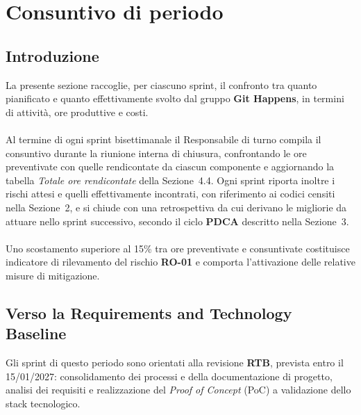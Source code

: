 \newpage

\section{Consuntivo di periodo}
\subsection{Introduzione}
La presente sezione raccoglie, per ciascuno sprint, il confronto tra quanto pianificato e quanto effettivamente svolto dal gruppo \textbf{Git Happens}, in termini di attività, ore produttive e costi. \\
\\
Al termine di ogni sprint bisettimanale il Responsabile di turno compila il consuntivo durante la riunione interna di chiusura, confrontando le ore preventivate con quelle rendicontate da ciascun componente e aggiornando la tabella \textit{Totale ore rendicontate} della Sezione~4.4. Ogni sprint riporta inoltre i rischi attesi e quelli effettivamente incontrati, con riferimento ai codici censiti nella Sezione~2, e si chiude con una retrospettiva da cui derivano le migliorie da attuare nello sprint successivo, secondo il ciclo \textbf{PDCA} descritto nella Sezione~3. \\
\\
Uno scostamento superiore al 15\% tra ore preventivate e consuntivate costituisce indicatore di rilevamento del rischio \textbf{RO-01} e comporta l'attivazione delle relative misure di mitigazione.

\subsection{Verso la Requirements and Technology Baseline}
Gli sprint di questo periodo sono orientati alla revisione \textbf{RTB}, prevista entro il 15/01/2027: consolidamento dei processi e della documentazione di progetto, analisi dei requisiti e realizzazione del \textit{Proof of Concept} (PoC) a validazione dello stack tecnologico.


